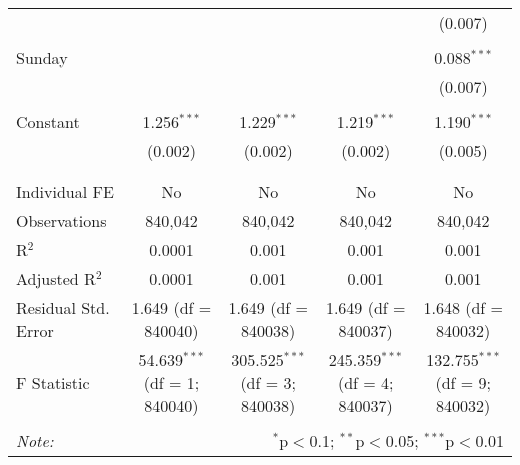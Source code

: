 \documentclass[
]{article}
\begin{document}
\begin{table}[!htbp]
{\begin{tabular}{@{\extracolsep{5pt}}lcccc}
  &  &  &  & (0.007) \\ 
  & & & & \\ 
 Sunday &  &  &  & 0.088$^{***}$ \\ 
  &  &  &  & (0.007) \\ 
  & & & & \\ 
 Constant & 1.256$^{***}$ & 1.229$^{***}$ & 1.219$^{***}$ & 1.190$^{***}$ \\ 
  & (0.002) & (0.002) & (0.002) & (0.005) \\ 
  & & & & \\ 
\hline \\[-1.8ex] 
Individual FE & No & No & No & No \\ 
Observations & 840,042 & 840,042 & 840,042 & 840,042 \\ 
R$^{2}$ & 0.0001 & 0.001 & 0.001 & 0.001 \\ 
Adjusted R$^{2}$ & 0.0001 & 0.001 & 0.001 & 0.001 \\ 
Residual Std. Error & 1.649 (df = 840040) & 1.649 (df = 840038) & 1.649 (df = 840037) & 1.648 (df = 840032) \\ 
F Statistic & 54.639$^{***}$ (df = 1; 840040) & 305.525$^{***}$ (df = 3; 840038) & 245.359$^{***}$ (df = 4; 840037) & 132.755$^{***}$ (df = 9; 840032) \\ 
\hline 
\hline \\[-1.8ex] 
\textit{Note:}  & \multicolumn{4}{r}{$^{*}$p$<$0.1; $^{**}$p$<$0.05; $^{***}$p$<$0.01} \\ 
\end{tabular}
} 
\end{table} 
\newpage
\end{document}
